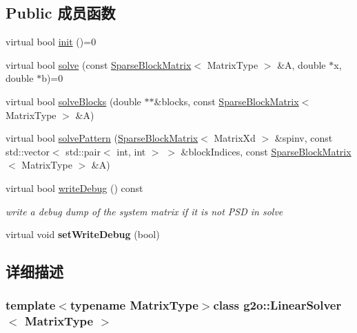 \subsection*{Public 成员函数}
\begin{DoxyCompactItemize}
\item 
virtual bool \hyperlink{classg2o_1_1LinearSolver_aebd961a94ef6de1bc66d2ca41dd2b17b}{init} ()=0
\item 
virtual bool \hyperlink{classg2o_1_1LinearSolver_aa44b40826d50203c8ce2ff258c34e030}{solve} (const \hyperlink{classg2o_1_1SparseBlockMatrix}{Sparse\-Block\-Matrix}$<$ Matrix\-Type $>$ \&A, double $\ast$x, double $\ast$b)=0
\item 
virtual bool \hyperlink{classg2o_1_1LinearSolver_a252e3658b3ba0c3577c33f846c514535}{solve\-Blocks} (double $\ast$$\ast$\&blocks, const \hyperlink{classg2o_1_1SparseBlockMatrix}{Sparse\-Block\-Matrix}$<$ Matrix\-Type $>$ \&A)
\item 
virtual bool \hyperlink{classg2o_1_1LinearSolver_adc74484f72bbe373622581fd597c1be3}{solve\-Pattern} (\hyperlink{classg2o_1_1SparseBlockMatrix}{Sparse\-Block\-Matrix}$<$ Matrix\-Xd $>$ \&spinv, const std\-::vector$<$ std\-::pair$<$ int, int $>$ $>$ \&block\-Indices, const \hyperlink{classg2o_1_1SparseBlockMatrix}{Sparse\-Block\-Matrix}$<$ Matrix\-Type $>$ \&A)
\item 
\hypertarget{classg2o_1_1LinearSolver_a8b6a84bd88f1bbc13d2c80c3a14d4693}{virtual bool \hyperlink{classg2o_1_1LinearSolver_a8b6a84bd88f1bbc13d2c80c3a14d4693}{write\-Debug} () const }\label{classg2o_1_1LinearSolver_a8b6a84bd88f1bbc13d2c80c3a14d4693}

\begin{DoxyCompactList}\small\item\em write a debug dump of the system matrix if it is not P\-S\-D in solve \end{DoxyCompactList}\item 
\hypertarget{classg2o_1_1LinearSolver_a969c406ccacc38705b2a88f5ed23cb9a}{virtual void {\bfseries set\-Write\-Debug} (bool)}\label{classg2o_1_1LinearSolver_a969c406ccacc38705b2a88f5ed23cb9a}

\end{DoxyCompactItemize}


\subsection{详细描述}
\subsubsection*{template$<$typename Matrix\-Type$>$class g2o\-::\-Linear\-Solver$<$ Matrix\-Type $>$}

